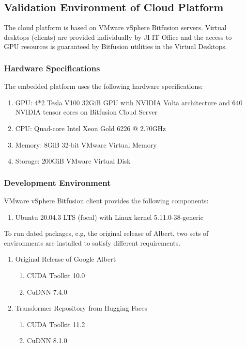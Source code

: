\documentclass[a4paper]{article}
\begin{document}
\subsection{Validation Environment of Cloud Platform}
The cloud platform is based on VMware vSphere Bitfusion servers. Virtual desktops (clients) are provided individually by JI IT Office and the access to GPU resources is guaranteed by Bitfusion utilities in the Virtual Desktops.
\subsubsection{Hardware Specifications}
The embedded platform uses the following hardware specifications:
\begin{enumerate}
    \item GPU: 4*2 Tesla V100 32GiB GPU with NVIDIA Volta architecture and 640 NVIDIA tensor cores on Bitfusion Cloud Server
    \item CPU: Quad-core Intel Xeon Gold 6226 @ 2.70GHz
    \item Memory: 8GiB 32-bit VMware Virtual Memory
    \item Storage: 200GiB VMware Virtual Disk
\end{enumerate}
\subsubsection{Development Environment}
VMware vSphere Bitfusion client provides the following components:
\begin{enumerate}
    \item Ubuntu 20.04.3 LTS (focal) with Linux kernel 5.11.0-38-generic
\end{enumerate}
To run dated packages, e.g, the original release of Albert, two sets of environments are installed to satisfy different requirements.
\begin{enumerate}
    \item Original Release of Google Albert
    \begin{enumerate}
        \item CUDA Toolkit 10.0
        \item CuDNN 7.4.0
    \end{enumerate}
    \item Transformer Repository from Hugging Faces
    \begin{enumerate}
        \item CUDA Toolkit 11.2
        \item CuDNN 8.1.0
    \end{enumerate}
\end{enumerate}
\end{document}
